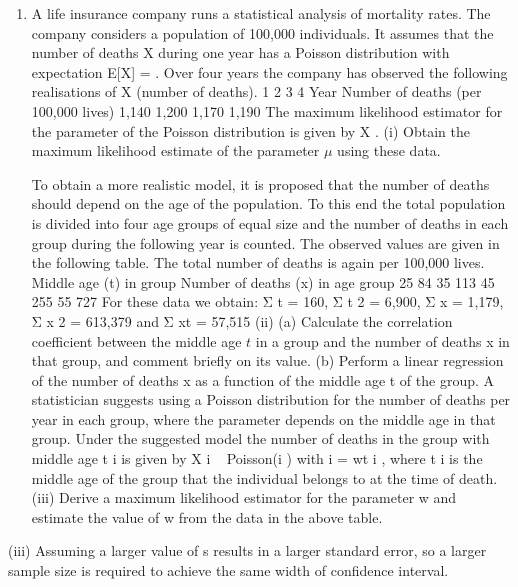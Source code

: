 \documentclass[a4paper,12pt]{article}
\begin{document}
\begin{enumerate}
\item A life insurance company runs a statistical analysis of mortality rates. The company considers a population of 100,000 individuals. It assumes that the number of deaths X during one year has a Poisson distribution with expectation E[X] = \mu. Over four years
the company has observed the following realisations of X (number of deaths).
1
2
3
4
Year
Number of deaths (per 100,000 lives) 1,140 1,200 1,170 1,190
The maximum likelihood estimator for the parameter \mu of the Poisson distribution is
given by X .
(i)
Obtain the maximum likelihood estimate of the parameter $\mu$ using these data.

To obtain a more realistic model, it is proposed that the number of deaths should
depend on the age of the population. To this end the total population is divided into
four age groups of equal size and the number of deaths in each group during the
following year is counted. The observed values are given in the following table. The
total number of deaths is again per 100,000 lives.
Middle age (t) in group
Number of deaths (x) in age group
25
84
35
113
45
255
55
727
For these data we obtain: Σ t = 160, Σ t 2 = 6,900, Σ x = 1,179, Σ x 2 = 613,379 and
Σ xt = 57,515
(ii)
(a) Calculate the correlation coefficient between the middle age $t$ in a group and the number of deaths x in that group, and comment briefly on its value.
(b) Perform a linear regression of the number of deaths x as a function of the middle age t of the group.
A statistician suggests using a Poisson distribution for the number of deaths per year in each group, where the parameter \mu depends on the middle age in that group. Under the suggested model the number of deaths in the group with middle age t i is given by X i ~ Poisson(\mu i ) with \mu i = wt i , where t i is the middle age of the group that the individual belongs to at the time of death.
(iii)
Derive a maximum likelihood estimator for the parameter w and estimate the value of w from the data in the above table.
\end{enumerate}

(iii) Assuming a larger value of s results in a larger standard error, so a larger sample size is required to achieve the same width of confidence interval.
\end{document}
